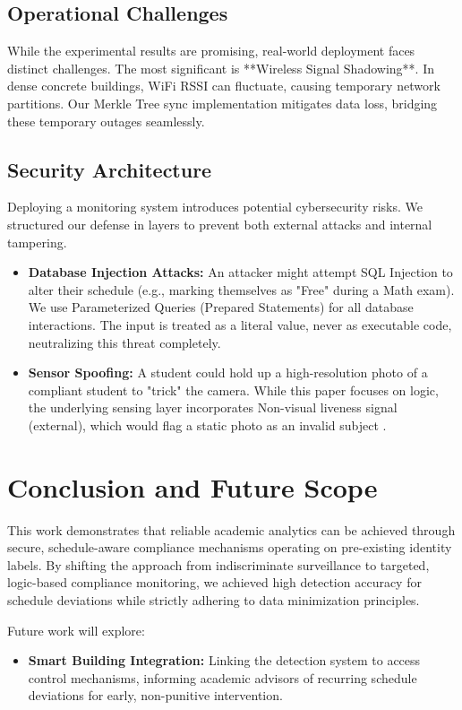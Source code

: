 \documentclass[conference]{IEEEtran}
\begin{document}
\subsection{Operational Challenges}
While the experimental results are promising, real-world deployment faces distinct challenges. The most significant is **Wireless Signal Shadowing**. In dense concrete buildings, WiFi RSSI can fluctuate, causing temporary network partitions. Our Merkle Tree sync implementation mitigates data loss, bridging these temporary outages seamlessly.

\subsection{Security Architecture}
Deploying a monitoring system introduces potential cybersecurity risks. We structured our defense in layers to prevent both external attacks and internal tampering.
\begin{itemize}
    \item \textbf{Database Injection Attacks:} An attacker might attempt SQL Injection to alter their schedule (e.g., marking themselves as "Free" during a Math exam). We use Parameterized Queries (Prepared Statements) for all database interactions. The input is treated as a literal value, never as executable code, neutralizing this threat completely.
    \item \textbf{Sensor Spoofing:} A student could hold up a high-resolution photo of a compliant student to "trick" the camera. While this paper focuses on logic, the underlying sensing layer incorporates Non-visual liveness signal (external), which would flag a static photo as an invalid subject \cite{b10}.
\end{itemize}

\section{Conclusion and Future Scope}
This work demonstrates that reliable academic analytics can be achieved through secure, schedule-aware compliance mechanisms operating on pre-existing identity labels. By shifting the approach from indiscriminate surveillance to targeted, logic-based compliance monitoring, we achieved high detection accuracy for schedule deviations while strictly adhering to data minimization principles.

Future work will explore:
\begin{itemize}
    \item \textbf{Smart Building Integration:} Linking the detection system to access control mechanisms, informing academic advisors of recurring schedule deviations for early, non-punitive intervention.
\end{itemize}
\end{document}
